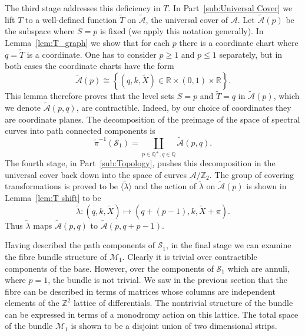 \documentclass{article}
\numberwithin{equation}{section}
\numberwithin{figure}{section}
\newcommand{\bra}[1]{\left(#1\right)}
\newcommand{\diffeo}{\cong}
\newcommand{\Z}{\mathbb{Z}}
\newcommand{\Q}{\mathbb{Q}}
\newcommand{\R}{\mathbb{R}}
\begin{document}
The third stage addresses this deficiency in $T$. In Part~\ref{sub:Universal Cover} we lift $T$ to a well-defined function $\tilde{T}$ on $\mathcal{\tilde{A}}$, the universal cover of $\mathcal{A}$. Let $\mathcal{\tilde{A}}(p)$ be the subspace where $S=p$ is fixed (we apply this notation generally). In Lemma~\ref{lem:T_graph} we show that for each $p$ there is a coordinate chart where $q=\tilde{T}$ is a coordinate. One has to consider $p \geq 1$ and $p \leq 1$ separately, but in both cases the coordinate charts have the form 
\[
\mathcal{\tilde{A}}(p) \diffeo \left\{ \bra{q,k,\tilde{X}} \in \R \times (0,1) \times \R \right\}.
\]
This lemma therefore proves that the level sets $S = p$ and $\tilde{T} = q$ in $\mathcal{\tilde{A}}(p)$, which we denote $\mathcal{\tilde{A}}(p,q)$, are contractible. Indeed, by our choice of coordinates they are coordinate planes. The decomposition of the preimage of the space of spectral curves into path connected components is
\[
\tilde{\pi}^{-1}(\mathcal{S}_1) = \coprod_{p \in \Q^+, q\in\Q} \mathcal{\tilde{A}}(p,q).
\]
The fourth stage, in Part~\ref{sub:Topology}, pushes this decomposition in the universal cover back down into the space of curves $\mathcal{A}/\mathbb{Z}_2$.
The group of covering transformations is proved to be $\langle \tilde{\lambda} \rangle$ and the action of $\tilde{\lambda}$ on $\mathcal{\tilde{A}}(p)$ is shown in Lemma~\ref{lem:T shift} to be
\[
\tilde{\lambda} : \bra{q,k,\tilde{X}} \mapsto \bra{q + (p-1),k,\tilde{X} + \pi}.
\]
Thus $\tilde{\lambda}$ maps $\mathcal{\tilde{A}}(p,q)$ to $\mathcal{\tilde{A}}(p,q + p-1)$. 

Having described the path components of $\mathcal{S}_1$, in the final stage we can examine the fibre bundle structure of $\mathcal{M}_1$. Clearly it is trivial over contractible components of the base. However, over the components of $\mathcal{S}_1$ which are annuli, where $p=1$, the bundle is not trivial. We saw in the previous section that the fibre can be described in terms of matrices whose columns are independent elements of the $\Z^2$ lattice of differentials. The nontrivial structure of the bundle can be expressed in terms of a monodromy action on this lattice. The total space of the bundle $\mathcal{M}_1$ is shown to be a disjoint union of two dimensional strips.
\end{document}
